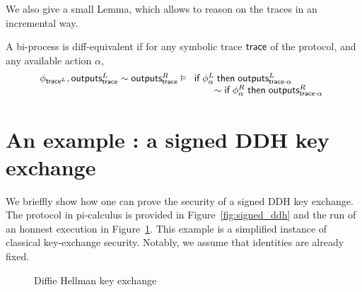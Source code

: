 We also give a small Lemma, which allows to reason on the traces in an incremental way.

\begin{lemma}
  A bi-process is diff-equivalent if for any symbolic trace $\textsf{trace}$ of the protocol, and any available action $\alpha$,
  \[
\begin{array}{l}
  \phi_{\textsf{trace}^L},  \textsf{outputs}_{\textsf{trace}}^L \sim \textsf{outputs}_{\textsf{trace}}^R  \vDash
\begin{array}[t]{l}
    \textsf{if}\; \phi_{\alpha}^L \;\textsf{then}\; \textsf{outputs}_{\textsf{trace}\cdot \alpha}^{L}
    \\ \qquad
    \sim  \textsf{if}\; \phi_{\alpha}^{R} \;\textsf{then}\; \textsf{outputs}_{\textsf{trace}\cdot \alpha}^{R} \end{array}\end{array}\]

\end{lemma}

\section{An example : a signed DDH key exchange}

We brieffly show how one can prove the security of a signed DDH key exchange. The protocol in pi-calculus is provided in Figure~\ref{fig:signed_ddh} and the run of an honnest execution in Figure~\ref{fig:dh_ke}. This example is a simplified instance of classical key-exchange security. Notably, we assume that identities are already fixed.

\begin{figure}
    \setmsckeyword{} 
    \begin{center}
    \begin{msc}{}
        \setlength{\instwidth}{0\mscunit}
        \setlength{\instdist}{7cm}
        \setlength{\topheaddist}{0cm}


        \nextlevel[-1]
        \nextlevel[1.5]
         \nextlevel[1.5]




       \end{msc}
       \end{center}
    \caption{Diffie Hellman key exchange}\label{fig:dh_ke}
\end{figure}

